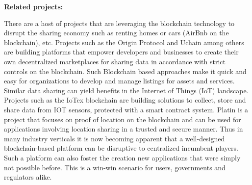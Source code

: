 %
%
%

\noindent
{\bf \textsf Related projects:}

There are a host of projects that are leveraging the blockchain technology to disrupt the sharing economy such as
renting homes or cars (AirBnb on the blockchain), etc. Projects such as the Origin Protocol and Uchain among others are
building platforms that empower developers and businesses to create their own decentralized marketplaces for sharing
data in accordance with strict controls on the blockchain.  Such Blockchain based approaches make it quick and easy for
organizations to develop and manage listings for assets and services. Similar data sharing can yield benefits in the
Internet of Things (IoT) landscape. Projects such as the IoTex blockchain are building solutions to collect, store and
share data from IOT sensors, protected with a smart contract system.  Platin \cite{platin} is a project that focuses on
proof of location on the blockchain and can be used for applications involving location sharing in a trusted and secure
manner. Thus in many industry verticals it is now becoming apparent that a well-designed blockchain-based platform can
be disruptive to centralized incumbent players. Such a platform can also foster the creation new applications that were
simply not possible before. This is a win-win scenario for users, governments and regulators alike.

